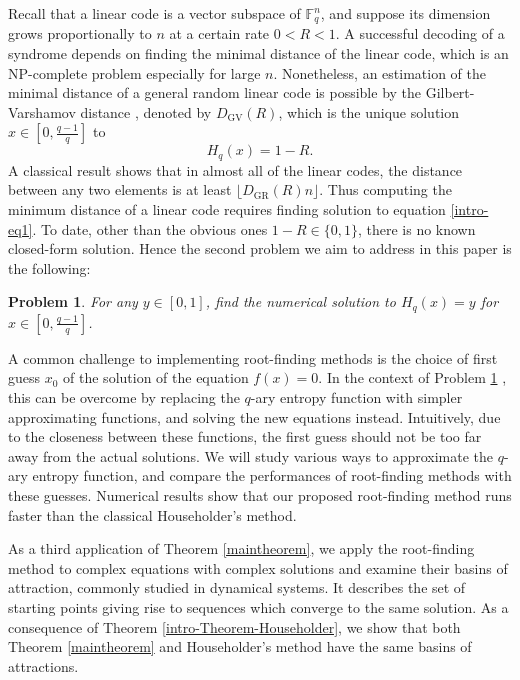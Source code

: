 \documentclass{article}
\newtheorem{problem}{Problem}[section]
\begin{document}
Recall that a linear code is a vector subspace of $\mathbb{F}_{q}^{n}$, and suppose its dimension grows proportionally to $n$ at a certain rate $0<R<1$. A successful decoding of a syndrome depends on finding the minimal distance of the linear code, which is an NP-complete problem \cite{Vardy-2002} especially for large $n$. Nonetheless, an estimation of the minimal distance of a general random linear code is possible by the Gilbert-Varshamov distance \cite{Gilbert-1952, Varshamov-1957}, denoted by $D_{\text{GV}}(R)$, which  is the unique solution $x\in [0,\frac{q-1}{q}]$ to
\begin{equation}\label{intro-eq1}
H_{q}(x)=1-R.
\end{equation}
A classical result shows that in almost all of the linear codes, the distance between any two elements is at least $\lfloor D_{\text{GR}}(R)n\rfloor$. Thus computing the minimum distance of a linear code requires finding  solution to equation \eqref{intro-eq1}. To date, other than the obvious ones $1-R\in \{0,1\}$, there is no known closed-form solution.  Hence the second problem we aim to address in this paper is the following:
\medskip
\begin{problem}\label{prob2}
For any $y\in [0,1]$, find the numerical solution to $H_{q}(x)=y$ 
for $x\in [0,\frac{q-1}{q}]$.
\end{problem}
\medskip
A common challenge to implementing root-finding methods is the choice of first guess $x_{0}$ of the solution of the equation $f(x)=0$. In the context of Problem \ref{prob2} , this can be overcome by replacing the $q$-ary entropy function with  simpler approximating functions, and solving the new equations instead. Intuitively, due to the closeness between these functions, the first guess should not be too far away from the actual solutions.  We will study various ways to approximate the $q$-ary entropy function, and compare the performances of root-finding methods with these guesses. Numerical results show that our proposed root-finding method runs faster than the classical Householder's method.

As a third application of Theorem \ref{maintheorem}, we apply the root-finding method to complex equations with complex solutions and examine their basins of attraction, commonly studied in dynamical systems. It describes the set of starting points giving rise to sequences which converge to the same solution. As a consequence of Theorem \ref{intro-Theorem-Householder}, we show that both Theorem \ref{maintheorem} and Householder's method have the same basins of attractions. 
\end{document}

